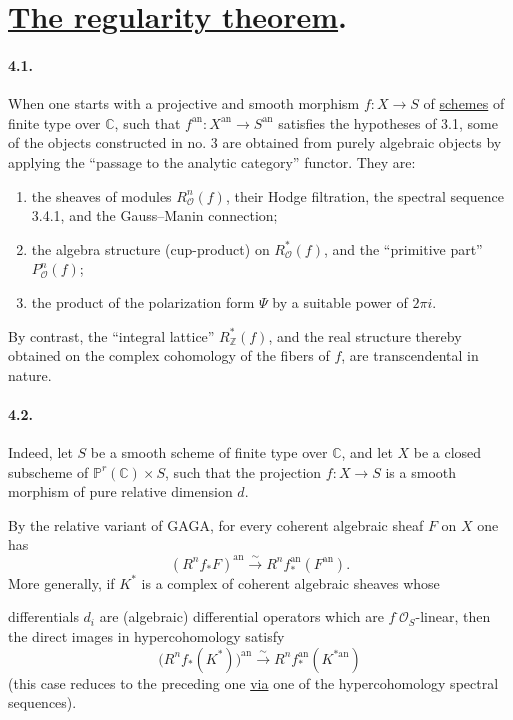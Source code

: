 \documentclass[10pt,leqno]{article}
\newcommand{\C}{\mathbb C}
\newcommand{\Z}{\mathbb Z}
\newcommand{\Pj}{\mathbb P}
\newcommand{\cO}{\mathcal O}
\theoremstyle{deligne}
\renewcommand{\underline}[1]{\uline{#1}}
\begin{document}
\section{\underline{The regularity theorem}.}

\paragraph{4.1.}
When one starts with a projective and smooth morphism $f:X\to S$ of \underline{schemes} of finite type over $\C$, such that $f^{\mathrm{an}}:X^{\mathrm{an}}\to S^{\mathrm{an}}$ satisfies the hypotheses of 3.1, some of the objects constructed in no. 3 are obtained from purely algebraic objects by applying the ``passage to the analytic category'' functor. They are:
\begin{enumerate}[label=\alph*)]
\item the sheaves of modules $R_\cO^n(f)$, their Hodge filtration, the spectral sequence 3.4.1, and the Gauss--Manin connection;
\item the algebra structure (cup-product) on $R_\cO^*(f)$, and the ``primitive part'' $P_\cO^n(f)$;
\item the product of the polarization form $\Psi$ by a suitable power of $2\pi i$.
\end{enumerate}
By contrast, the ``integral lattice'' $R_\Z^*(f)$, and the real structure thereby obtained on the complex cohomology of the fibers of $f$, are transcendental in nature.

\paragraph{4.2.}
Indeed, let $S$ be a smooth scheme of finite type over $\C$, and let $X$ be a closed subscheme of $\Pj^r(\C)\times S$, such that the projection $f:X\to S$ is a smooth morphism of pure relative dimension $d$.

By the relative variant of GAGA, for every coherent algebraic sheaf $F$ on $X$ one has
\[
(R^nf_*F)^{\mathrm{an}}\xrightarrow{\sim}R^nf_*^{\mathrm{an}}(F^{\mathrm{an}}).
\]
More generally, if $K^*$ is a complex of coherent algebraic sheaves whose


differentials $d_i$ are (algebraic) differential operators which are $f^\cdot\cO_S$-linear, then the direct images in hypercohomology satisfy
\[
  \bigl(R^n f_*(K^*)\bigr)^{\mathrm{an}}
  \xrightarrow{\sim}
  R^n f_*^{\mathrm{an}}(K^{*\mathrm{an}})
\]
(this case reduces to the preceding one \underline{via} one of the hypercohomology spectral sequences).
\end{document}
